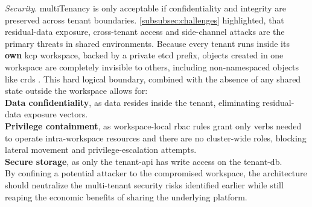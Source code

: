 \documentclass[11pt, a4paper, oneside, listof=totoc]{scrartcl}
\begin{document}
\begin{enumerate}[label={[\arabic*]:},
                    ref=Challenge~\arabic*,
                    leftmargin=*,
                    itemsep=0.6\baselineskip]
                    \item\label{chal:architectureSecurity}
                        \textit{Security}.
                        \Gls{multiTenancy} is only acceptable if confidentiality and integrity are
                        preserved across tenant boundaries.
                        \autoref{subsubsec:challenges} highlighted, that residual-data exposure,
                        cross-tenant access and side-channel attacks are the primary threats in
                        shared environments.
                        Because every tenant runs inside its \textbf{own} \gls{kcp} workspace,
                        backed by a private \gls{etcd} prefix, objects created in one workspace are
                        completely invisible to others, including non-namespaced objects like
                        \glspl{crd} \parencite{kcpWorkspaces}.
                        This hard logical boundary, combined with the absence of any shared state
                        outside the workspace allows for:
                        \\
                        \textbf{Data confidentiality}, as data resides inside the tenant,
                        eliminating residual-data exposure vectors.
                        \\
                        \textbf{Privilege containment}, as workspace-local \gls{rbac} rules grant
                        only verbs needed to operate intra-workspace resources and there are no
                        cluster-wide roles, blocking lateral movement and privilege-escalation
                        attempts.
                        \\
                        \textbf{Secure storage}, as only the tenant-\gls{api} has write access on
                        the tenant-\gls{db}.
                        \\
                        By confining a potential attacker to the compromised workspace, the
                        architecture should neutralize the multi-tenant security risks identified
                        earlier while still reaping the economic benefits of sharing the underlying
                        platform.
                        
                \end{enumerate}
\end{document}
